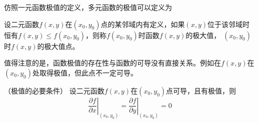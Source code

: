 仿照一元函数极值的定义，多元函数的极值可以定义为
\begin{definition}
    设二元函数$f(x,y)$在$(x_0,y_0)$点的某邻域内有定义，如果$(x,y)$位于该邻域时恒有$f(x,y)\leq f(x_0,y_0)$，则称$f(x_0,y_0)$时函数$f(x,y)$的极大值，
    $(x_0,y_0)$时$f(x,y)$的极大值点。
\end{definition}

值得注意的是，函数极值的存在性与函数的可导没有直接关系。例如在$f(x,y)$在$(x_0,y_0)$处取得极值，但此点不一定可导。

\begin{theorem}
    （极值的必要条件）
    设二元函数$f(x,y)$在$(x_0,y_0)$点可导，且有极值，则
    \[ \left.\frac{\partial f}{\partial x}\right|_{(x_0, y_0)} = \left.\frac{\partial f}{\partial y}\right|_{(x_0, y_0)} = 0 \]
\end{theorem}


